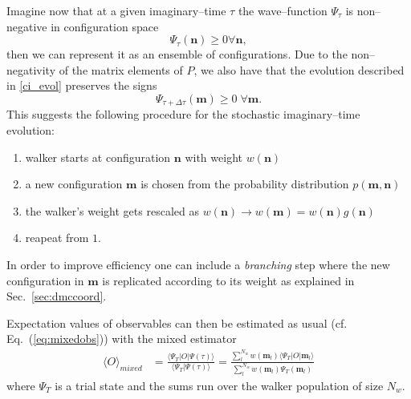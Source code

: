 Imagine now that at a given imaginary--time $\tau$ the wave--function $\Psi_{\tau}$ is non--negative in configuration 
space
\begin{equation}
\Psi_{\tau}(\mathbf{n}) \geq 0 \forall\mathbf{n} ,
\end{equation}
then we can represent it as an ensemble of configurations. Due to the non--negativity of the matrix elements of $P$, we also have
that the evolution described in \eqref{ci_evol} preserves the signs
\begin{equation}
\Psi_{\tau+\Delta\tau}(\mathbf{m}) \geq 0 \; \forall \mathbf{m} .
\end{equation}
This suggests the following procedure for the stochastic imaginary--time evolution: 
\begin{enumerate}
 \item walker starts at configuration $\mathbf{n}$ with weight $w(\mathbf{n})$
 \item a new configuration $\mathbf{m}$ is chosen from the probability distribution $p(\mathbf{m},\mathbf{n})$
 \item the walker's weight gets rescaled as $w(\mathbf{n}) \to w(\mathbf{m})=w(\mathbf{n})g(\mathbf{n})$
 \item reapeat from $1.$
\end{enumerate}
In order to improve efficiency one can include a {\it branching} step where the new configuration in $\mathbf{m}$
is replicated according to its weight as explained in Sec.~\ref{sec:dmccoord}.

Expectation values of observables can then be estimated as usual (cf. Eq.~(\eqref{eq:mixedobs})) with the mixed estimator
\begin{equation}
\begin{split}
\langle O\rangle_{mixed} &= \frac{\langle \Psi_T\lvert O \rvert \Psi(\tau)\rangle}{\langle \Psi_T\vert \Psi(\tau)\rangle}= \frac{  \sum_l^{N_{w}} w(\mathbf{m}_{l}) \langle \Psi_T\lvert O \rvert \mathbf{m}_{l}\rangle}{\sum_l^{N_{w}}w(\mathbf{m}_{l})\Psi_T(\mathbf{m}_{l})}
\end{split}
\end{equation} 
where $\Psi_T$ is a trial state and the sums run over the walker population of size $N_w$.


